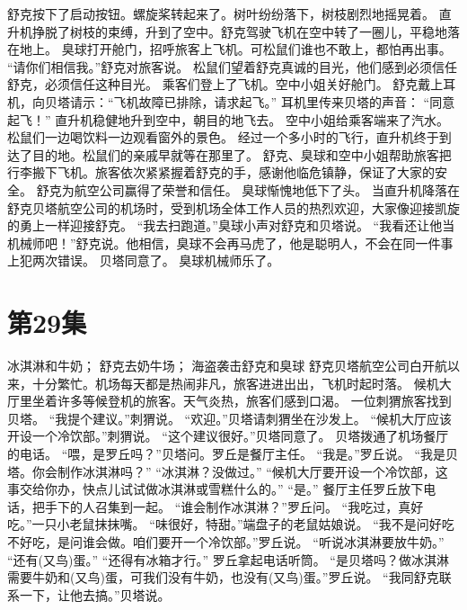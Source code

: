 \documentclass[a4paper,12pt,UTF8,twoside]{ctexbook}
\begin{document}
        舒克按下了启动按钮。螺旋桨转起来了。树叶纷纷落下，树枝剧烈地摇晃着。 
        直升机挣脱了树枝的束缚，升到了空中。舒克驾驶飞机在空中转了一圈儿，平稳地落在地上。 
        臭球打开舱门，招呼旅客上飞机。可松鼠们谁也不敢上，都怕再出事。 
        “请你们相信我。”舒克对旅客说。 
        松鼠们望着舒克真诚的目光，他们感到必须信任舒克，必须信任这种目光。 
        乘客们登上了飞机。空中小姐关好舱门。 
        舒克戴上耳机，向贝塔请示：“飞机故障已排除，请求起飞。” 
        耳机里传来贝塔的声音： 
        “同意起飞！” 
        直升机稳健地升到空中，朝目的地飞去。 
        空中小姐给乘客端来了汽水。松鼠们一边喝饮料一边观看窗外的景色。 
        经过一个多小时的飞行，直升机终于到达了目的地。松鼠们的亲戚早就等在那里了。 
        舒克、臭球和空中小姐帮助旅客把行李搬下飞机。旅客依次紧紧握着舒克的手，感谢他临危镇静，保证了大家的安全。 
        舒克为航空公司赢得了荣誉和信任。 
        臭球惭愧地低下了头。 
        当直升机降落在舒克贝塔航空公司的机场时，受到机场全体工作人员的热烈欢迎，大家像迎接凯旋的勇上一样迎接舒克。 
        “我去扫跑道。”臭球小声对舒克和贝塔说。 
        “我看还让他当机械师吧！”舒克说。他相信，臭球不会再马虎了，他是聪明人，不会在同一件事上犯两次错误。 
        贝塔同意了。 
        臭球机械师乐了。   \chapter{第29集} 
        冰淇淋和牛奶； 
        舒克去奶牛场； 
        海盗袭击舒克和臭球   
        舒克贝塔航空公司白开航以来，十分繁忙。机场每天都是热闹非凡，旅客进进出出，飞机时起时落。 
        候机大厅里坐着许多等候登机的旅客。天气炎热，旅客们感到口渴。 
        一位刺猬旅客找到贝塔。 
        “我提个建议。”刺猬说。 
        “欢迎。”贝塔请刺猬坐在沙发上。 
        “候机大厅应该开设一个冷饮部。”刺猬说。 
        “这个建议很好。”贝塔同意了。 
        贝塔拨通了机场餐厅的电话。 
        “喂，是罗丘吗？”贝塔问。罗丘是餐厅主任。 
        “我是。”罗丘说。 
        “我是贝塔。你会制作冰淇淋吗？” 
        “冰淇淋？没做过。” 
        “候机大厅要开设一个冷饮部，这事交给你办，快点儿试试做冰淇淋或雪糕什么的。” 
        “是。” 
        餐厅主任罗丘放下电话，把手下的人召集到一起。 
        “谁会制作冰淇淋？”罗丘问。 
        “我吃过，真好吃。”一只小老鼠抹抹嘴。 
        “味很好，特甜。”端盘子的老鼠姑娘说。 
        “我不是问好吃不好吃，是问谁会做。咱们要开一个冷饮部。”罗丘说。 
        “听说冰淇淋要放牛奶。” 
        “还有(又鸟)蛋。” 
        “还得有冰箱才行。” 
        罗丘拿起电话听筒。 
        “是贝塔吗？做冰淇淋需要牛奶和(又鸟)蛋，可我们没有牛奶，也没有(又鸟)蛋。”罗丘说。 
        “我同舒克联系一下，让他去搞。”贝塔说。 
\end{document}
